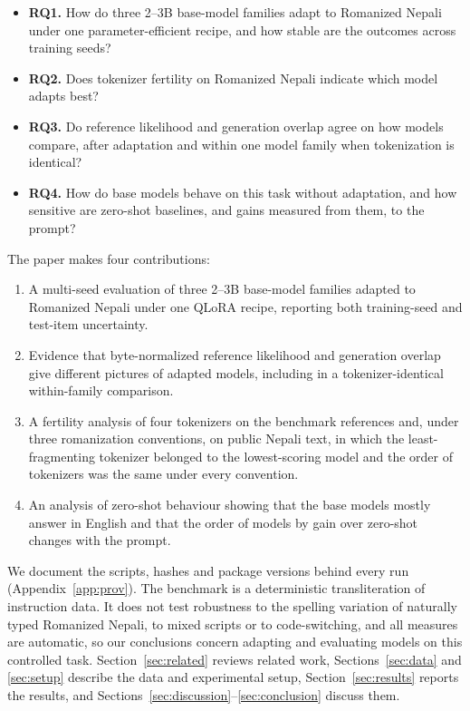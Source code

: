 \documentclass{article}
\begin{document}
\begin{itemize}[leftmargin=1.6em]
\item \textbf{RQ1.} How do three 2–3B base-model families adapt to Romanized Nepali under one parameter-efficient recipe, and how stable are the outcomes across training seeds?
\item \textbf{RQ2.} Does tokenizer fertility on Romanized Nepali indicate which model adapts best?
\item \textbf{RQ3.} Do reference likelihood and generation overlap agree on how models compare, after adaptation and within one model family when tokenization is identical?
\item \textbf{RQ4.} How do base models behave on this task without adaptation, and how sensitive are zero-shot baselines, and gains measured from them, to the prompt?
\end{itemize}

The paper makes four contributions:

\begin{enumerate}[label=(\arabic*),leftmargin=2.2em]
\item A multi-seed evaluation of three 2–3B base-model families adapted to Romanized Nepali under one QLoRA recipe, reporting both training-seed and test-item uncertainty.
\item Evidence that byte-normalized reference likelihood and generation overlap give different pictures of adapted models, including in a tokenizer-identical within-family comparison.
\item A fertility analysis of four tokenizers on the benchmark references and, under three romanization conventions, on public Nepali text, in which the least-fragmenting tokenizer belonged to the lowest-scoring model and the order of tokenizers was the same under every convention.
\item An analysis of zero-shot behaviour showing that the base models mostly answer in English and that the order of models by gain over zero-shot changes with the prompt.
\end{enumerate}

We document the scripts, hashes and package versions behind every run (Appendix~\ref{app:prov}). The benchmark is a deterministic transliteration of instruction data. It does not test robustness to the spelling variation of naturally typed Romanized Nepali, to mixed scripts or to code-switching, and all measures are automatic, so our conclusions concern adapting and evaluating models on this controlled task. Section~\ref{sec:related} reviews related work, Sections~\ref{sec:data} and \ref{sec:setup} describe the data and experimental setup, Section~\ref{sec:results} reports the results, and Sections~\ref{sec:discussion}–\ref{sec:conclusion} discuss them.
\end{document}
